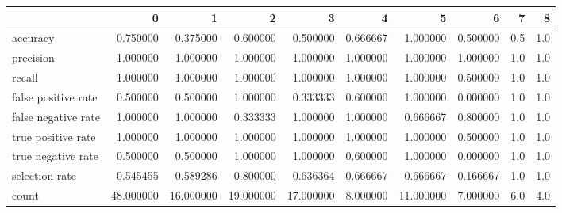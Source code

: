 \begin{tabular}{lrrrrrrrrr}
\toprule
{} &          0 &          1 &          2 &          3 &         4 &          5 &         6 &    7 &    8 \\
\midrule
accuracy            &   0.750000 &   0.375000 &   0.600000 &   0.500000 &  0.666667 &   1.000000 &  0.500000 &  0.5 &  1.0 \\
precision           &   1.000000 &   1.000000 &   1.000000 &   1.000000 &  1.000000 &   1.000000 &  1.000000 &  1.0 &  1.0 \\
recall              &   1.000000 &   1.000000 &   1.000000 &   1.000000 &  1.000000 &   1.000000 &  0.500000 &  1.0 &  1.0 \\
false positive rate &   0.500000 &   0.500000 &   1.000000 &   0.333333 &  0.600000 &   1.000000 &  0.000000 &  1.0 &  1.0 \\
false negative rate &   1.000000 &   1.000000 &   0.333333 &   1.000000 &  1.000000 &   0.666667 &  0.800000 &  1.0 &  1.0 \\
true positive rate  &   1.000000 &   1.000000 &   1.000000 &   1.000000 &  1.000000 &   1.000000 &  0.500000 &  1.0 &  1.0 \\
true negative rate  &   0.500000 &   0.500000 &   1.000000 &   1.000000 &  0.600000 &   1.000000 &  0.000000 &  1.0 &  1.0 \\
selection rate      &   0.545455 &   0.589286 &   0.800000 &   0.636364 &  0.666667 &   0.666667 &  0.166667 &  1.0 &  1.0 \\
count               &  48.000000 &  16.000000 &  19.000000 &  17.000000 &  8.000000 &  11.000000 &  7.000000 &  6.0 &  4.0 \\
\bottomrule
\end{tabular}
